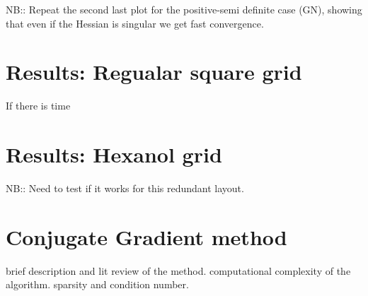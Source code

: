 \documentclass[a4paper,fleqn,usenatbib]{mnras}
\begin{document}
NB:: Repeat the second last plot for the positive-semi definite case (GN), showing that even if the Hessian is singular we get fast convergence.

\section{Results: Regualar square grid}
If there is time

\section{Results: Hexanol grid}
NB:: Need to test if it works for this redundant layout.


\section{Conjugate Gradient method}
brief description and lit review of the method.
computational complexity of the algorithm.
sparsity and condition number.
% 
% 
% 
% 
% 
% 
% 
% 
% 
\end{document}
